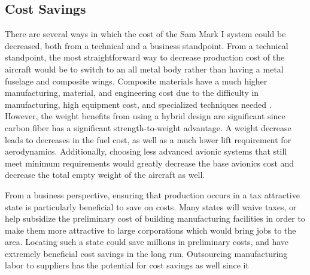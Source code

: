 \subsection{Cost Savings}

There are several ways in which the cost of the Sam Mark I system could be decreased, both from a technical and a business standpoint. From a technical standpoint, the most straightforward way to decrease production cost of the aircraft would be to switch to an all metal body rather than having a metal fuselage and composite wings. Composite materials have a much higher manufacturing, material, and engineering cost due to the difficulty in manufacturing, high equipment cost, and specialized techniques needed \cite{compositecost}. However, the weight benefits from using a hybrid design are significant since carbon fiber has a significant strength-to-weight advantage. A weight decrease leads to decreases in the fuel cost, as well as a much lower lift requirement for aerodynamics. Additionally, choosing less advanced avionic systems that still meet minimum requirements would greatly decrease the base avionics cost and decrease the total empty weight of the aircraft as well.

From a business perspective, ensuring that production occurs in a tax attractive state is particularly beneficial to save on costs. Many states will waive taxes, or help subsidize the preliminary cost of building manufacturing facilities in order to make them more attractive to large corporations which would bring jobs to the area. Locating such a state could save millions in preliminary costs, and have extremely beneficial cost savings in the long run. Outsourcing manufacturing labor to suppliers has the potential for cost savings as well since it 







